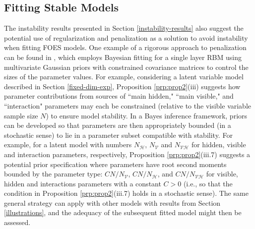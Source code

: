 \documentclass[numbib]{imamat}
\theoremstyle{theorem}
\theoremstyle{lemma}
\theoremstyle{example}
\theoremstyle{corollary}
\theoremstyle{definition}
\theoremstyle{remark}
\theoremstyle{approximation}
\theoremstyle{scheme}
\newcommand{\ak}[1]{{\color{blue} #1}}
\begin{document}
\hypertarget{stable-models}{%
\subsection{Fitting Stable Models}\label{stable-models}}

\ak{The instability results presented in Section \ref{instability-results} also suggest the potential use of regularization and penalization as a solution to avoid instability when fitting FOES models. One example of a rigorous approach to penalization can be found in \citet{kaplan2019properties}, which employs Bayesian fitting for a single layer RBM using multivariate Gaussian priors with constrained covariance matrices to control the sizes of the parameter values. For example, considering a latent variable model described in Section \ref{fixed-dim-exp}, Proposition \ref{prp:prop2}(iii) suggests how parameter contributions from sources of ``main hidden," ``main visible," and ``interaction" parameters may each be constrained (relative to the visible variable sample size $N$) to ensure model stability. In a Bayes inference framework, priors can be developed so that parameters are then appropriately bounded (in a stochastic sense) to lie in a parameter subset compatible with stability. For example, for a latent model with numbers $N_{\mathcal{H}}$, $N_{\mathcal{V}}$ and $N_{\mathcal{VH}}$ for hidden, visible and interaction parameters, respectively, Proposition \ref{prp:prop2}(iii.7) suggests a potential prior specification where parameters have root second moments bounded by the parameter type: $C N/N_{\mathcal{V}}$, $C N/N_{\mathcal{H}}$, and $C N/N_{\mathcal{VH}}$ for visible, hidden and interactions parameters with a constant $C>0$ (i.e., so that the condition in Proposition \ref{prp:prop2}(iii.7) holds in a stochastic sense). The same general strategy can apply with other models with results from Section \ref{illustrations}, and the adequacy of the subsequent fitted model might then be assessed.

}
\end{document}
